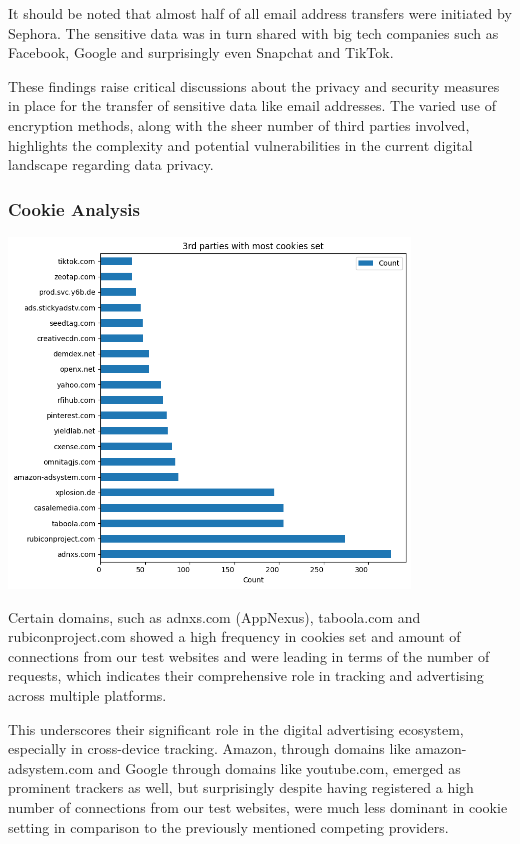 It should be noted that almost half of all email address transfers were initiated by Sephora. The sensitive data was in turn shared with big tech companies such as Facebook, Google and surprisingly even Snapchat and TikTok.

These findings raise critical discussions about the privacy and security measures in place for the transfer of sensitive data like email addresses. The varied use of encryption methods, along with the sheer number of third parties involved, highlights the complexity and potential vulnerabilities in the current digital landscape regarding data privacy.


\subsubsection{Cookie Analysis}
\includegraphics[width=0.8\textwidth]{./assets/thirdpartieswithmostcookiesset.png}

Certain domains, such as adnxs.com (AppNexus), taboola.com and rubiconproject.com showed a high frequency in cookies set and amount of connections from our test websites and were leading in terms of the number of requests, which indicates their comprehensive role in tracking and advertising across multiple platforms.

This underscores their significant role in the digital advertising ecosystem, especially in cross-device tracking. Amazon, through domains like amazon-adsystem.com and Google through domains like youtube.com, emerged as prominent trackers as well, but surprisingly despite having registered a high number of connections from our test websites, were much less dominant in cookie setting in comparison to the previously mentioned competing providers. 

